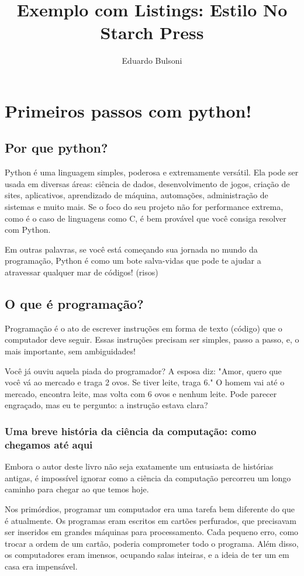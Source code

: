 \documentclass[12pt]{book}
\title{Exemplo com Listings: Estilo No Starch Press}
\author{Eduardo Bulsoni}
\date{}
\begin{document}
	
	\tableofcontents
	\chapter{Primeiros passos com python!}
	
	\section{Por que python?}
	
	Python é uma linguagem simples, poderosa e extremamente versátil. Ela pode ser usada em diversas áreas: ciência de dados, desenvolvimento de jogos, criação de sites, aplicativos, aprendizado de máquina, automações, administração de sistemas e muito mais. Se o foco do seu projeto não for performance extrema, como é o caso de linguagens como C, é bem provável que você consiga resolver com Python.

	Em outras palavras, se você está começando sua jornada no mundo da programação, Python é como um bote salva-vidas que pode te ajudar a atravessar qualquer mar de códigos! (risos) \newline
	
	\section{O que é programação?}
	
	Programação é o ato de escrever instruções em forma de texto (código) que o computador deve seguir. Essas instruções precisam ser simples, passo a passo, e, o mais importante, sem ambiguidades!
	
	Você já ouviu aquela piada do programador? A esposa diz: "Amor, quero que você vá ao mercado e traga 2 ovos. Se tiver leite, traga 6." O homem vai até o mercado, encontra leite, mas volta com 6 ovos e nenhum leite. Pode parecer engraçado, mas eu te pergunto: a instrução estava clara?
	
	\subsection{Uma breve história da ciência da computação: como chegamos até aqui}
	
	Embora o autor deste livro não seja exatamente um entusiasta de histórias antigas, é impossível ignorar como a ciência da computação percorreu um longo caminho para chegar ao que temos hoje.
	
	Nos primórdios, programar um computador era uma tarefa bem diferente do que é atualmente. Os programas eram escritos em cartões perfurados, que precisavam ser inseridos em grandes máquinas para processamento. Cada pequeno erro, como trocar a ordem de um cartão, poderia comprometer todo o programa. Além disso, os computadores eram imensos, ocupando salas inteiras, e a ideia de ter um em casa era impensável.
	
\end{document}
